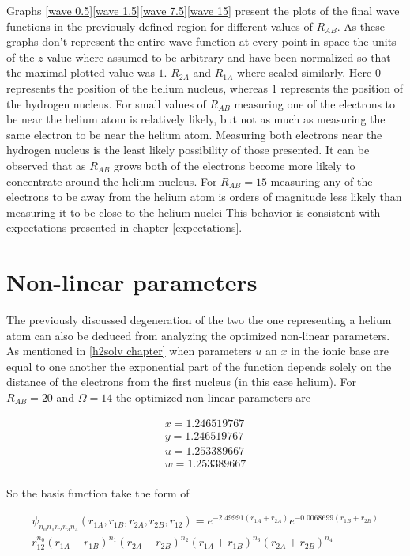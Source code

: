 \documentclass{pracalicmgr}
\begin{document}
Graphs \ref{wave 0.5}\ref{wave 1.5}\ref{wave 7.5}\ref{wave 15} present the plots of the final wave functions in the previously defined region for different values of $R_{AB}$. As these graphs don't represent the entire wave function at every point in space the units of the $z$ value where assumed to be arbitrary and have been normalized so that the maximal plotted value was $1$. $R_{2A}$ and $R_{1A}$ where scaled similarly. Here $0$ represents the position of the helium nucleus, whereas $1$ represents the position of the hydrogen nucleus. 
For small values of $R_{AB}$ measuring one of the electrons to be near the helium atom is relatively likely, but not as much as measuring the same electron to be near the helium atom. Measuring both electrons near the hydrogen nucleus is the least likely possibility of those presented. It can be observed that as $R_{AB}$ grows both of the electrons become more likely to concentrate around the helium nucleus. For $R_{AB} = 15$ measuring any of the electrons to be away from the helium atom is orders of magnitude less likely than measuring it to be close to the helium nuclei  This behavior is consistent with expectations presented in chapter \ref{expectations}. 

\section{Non-linear parameters}
The previously discussed degeneration of the two the one representing a helium atom can also be deduced from analyzing the optimized non-linear parameters. As mentioned in \ref{h2solv chapter} when parameters $u$ an $x$ in the ionic base are equal to one another the exponential part of the function depends solely on the distance of the electrons from the first nucleus (in this case helium). For $R_{AB}=20$ and $\Omega=14$ the optimized non-linear parameters are

\begin{align*} 
    x=1.246519767\\
    y=1.246519767\\
    u=1.253389667\\
    w=1.253389667\\
\end{align*}

So the basis function take the form of

\begin{multline}
    \psi_{n_0 n_1 n_2 n_3 n_4} \left( r_{1A}, r_{1B}, r_{2A}, r_{2B}, r_{12} \right) = e^{-2.49991\left(r_{1A}+r_{2A}\right)}e^{-0.0068699\left(r_{1B}+r_{2B}\right)}\\
    r_{12}^{n_0}{\left(r_{1A}-r_{1B}\right)}^{n_1}{\left(r_{2A}-r_{2B}\right)}^{n_2}{\left(r_{1A}+r_{1B}\right)}^{n_3}{\left(r_{2A}+r_{2B}\right)}^{n_4}
\end{multline}
\end{document}
